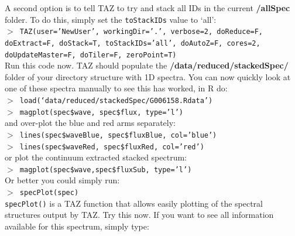 \documentclass[12pt]{article}
\begin{document}
 A second option is to tell TAZ to try and stack all IDs in the current \textbf{/allSpec} folder. To do this, simply set the \texttt{toStackIDs} value to `all': \\
  

  \hspace{10mm} \texttt{$>$ TAZ(user='NewUser', workingDir='.', verbose=2, doReduce=F, doExtract=F, doStack=T,  toStackIDs='all', doAutoZ=F, cores=2, doUpdateMaster=F, doTiler=F, zeroPoint=T)}\\   

Run this code now. TAZ should populate the \textbf{/data/reduced/stackedSpec/} folder of your directory structure with 1D spectra. You can now quickly look at one of these spectra manually to see this has worked, in R do:\\

\hspace{10mm} \texttt{$>$ load(`data/reduced/stackedSpec/G006158.Rdata')} \\

\hspace{10mm} \texttt{$>$ magplot(spec\$wave, spec\$flux, type='l')} \\

and over-plot the blue and red arms separately:\\


\hspace{10mm} \texttt{$>$ lines(spec\$waveBlue, spec\$fluxBlue, col='blue')}\\

\hspace{10mm} \texttt{$>$ lines(spec\$waveRed, spec\$fluxRed, col='red')}\\

or plot the continuum extracted stacked spectrum:\\

\hspace{10mm} \texttt{$>$ magplot(spec\$wave,spec\$fluxSub, type='l')}\\

Or better you could simply run:\\

\hspace{10mm} \texttt{$>$ specPlot(spec)}\\

\texttt{specPlot()} is a TAZ function that allows easily plotting of the spectral structures output by TAZ. Try this now. If you want to see all information available for this spectrum, simply type:\\
\end{document}
